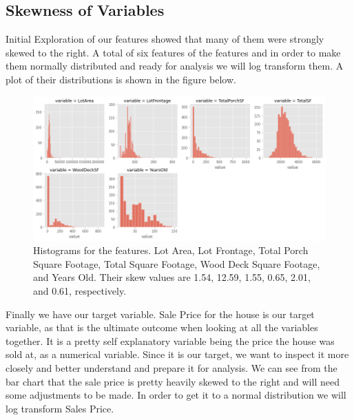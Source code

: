 \documentclass{article}
\begin{document}
	\subsection{Skewness of Variables}
	 
	Initial Exploration of our features showed that many of them were strongly skewed to the right. A total of six features of the features and in order to make them normally distributed and ready for analysis we will log transform them. A plot of their distributions is shown in the figure below.
	
	\begin{figure}
		\includegraphics[width=\textwidth]{skewplots}
		\caption{Histograms for the features. Lot Area, Lot Frontage, Total Porch Square Footage, Total Square Footage, Wood Deck Square Footage, and Years Old. Their skew values are 1.54, 12.59, 1.55, 0.65, 2.01, and 0.61, respectively.}
		\label{fig:skew}
	\end{figure}
	
	Finally we have our target variable. Sale Price for the house is our target variable, as that is the ultimate outcome when looking at all the variables together. It is a pretty self explanatory variable being the price the house was sold at, as a numerical variable. Since it is our target, we want to inspect it more closely and better understand and prepare it for analysis. We can see from the bar chart that the sale price is pretty heavily skewed to the right and will need some adjustments to be made. In order to get it to a normal distribution we will log transform Sales Price.

\end{document}
